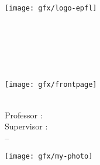 \begin{titlepage}
	\begin{addmargin}[-1cm]{-2cm}
    \begin{center}
        \large  

        \hfill

        \begin{minipage}{\textwidth}
          \begin{center}
            \texttt{[image: gfx/logo-epfl]}  \\
          \end{center}
        \end{minipage}\\[1cm]

        \vfill



        \begingroup
            \color{Maroon}\spacedallcaps{\myTitle} \\ \bigskip
        \endgroup

        \mySubtitle \\[2.5cm] \medskip   


        \vfill

        \texttt{[image: gfx/frontpage]} \\[2.5cm] \bigskip


        \begin{minipage}{0.59\textwidth}
          \begin{flushleft}
            \medskip
            \textsc{\myName} \\
            Professor : \textsc{\myProf} \\
            Supervisor : \textsc{\mySupervisor} \\
            \myFaculty -- \myDepartment                             
          \end{flushleft}
        \end{minipage}
        \begin{minipage}{0.39\textwidth}
          \begin{flushright}
            \texttt{[image: gfx/my-photo]}  \\
          \end{flushright}
        \end{minipage}\\[1.5cm]


\end{center}
\end{addmargin}
\end{titlepage}
